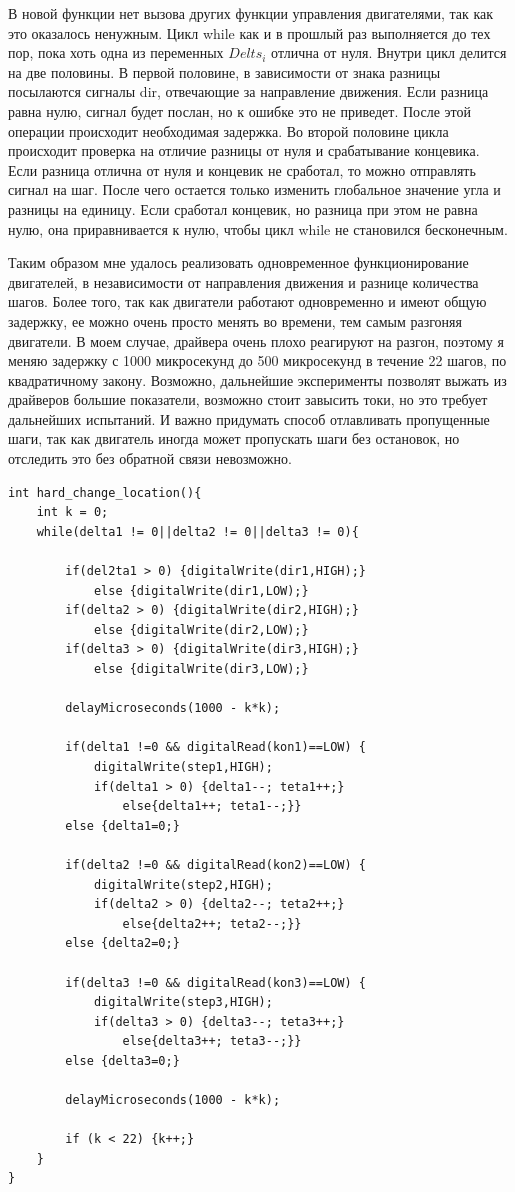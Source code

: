 В новой функции нет вызова других функции управления двигателями, так как это оказалось ненужным. Цикл while как и в прошлый раз выполняется до тех пор, пока хоть одна из переменных $Delts_{i}$ отлична от нуля. Внутри цикл делится на две половины. В первой половине, в зависимости от знака разницы посылаются сигналы dir, отвечающие за направление движения. Если разница равна нулю, сигнал будет послан, но к ошибке это не приведет. После этой операции происходит необходимая задержка. Во второй половине цикла происходит проверка на отличие разницы от нуля и срабатывание концевика. Если разница отлична от нуля и концевик не сработал, то можно отправлять сигнал на шаг. После чего остается только изменить глобальное значение угла и разницы на единицу. Если сработал концевик, но разница при этом не равна нулю, она приравнивается к нулю, чтобы цикл while не становился бесконечным.  

Таким образом мне удалось реализовать одновременное функционирование двигателей, в независимости от направления движения и разнице количества шагов. Более того, так как двигатели работают одновременно и имеют общую задержку, ее можно очень просто менять во времени, тем самым разгоняя двигатели. В моем случае, драйвера очень плохо реагируют на разгон, поэтому я меняю задержку с 1000 микросекунд до 500 микросекунд в течение 22 шагов, по квадратичному закону. Возможно, дальнейшие эксперименты позволят выжать из драйверов большие показатели, возможно стоит завысить токи, но это требует дальнейших испытаний. И важно придумать способ отлавливать пропущенные шаги, так как двигатель иногда может пропускать шаги без остановок, но отследить это без обратной связи невозможно.

\begin{lstlisting}[style=uno,caption=Усложненная функция с плавным разгоном]
int hard_change_location(){
    int k = 0;
    while(delta1 != 0||delta2 != 0||delta3 != 0){

        if(del2ta1 > 0) {digitalWrite(dir1,HIGH);}
            else {digitalWrite(dir1,LOW);}
        if(delta2 > 0) {digitalWrite(dir2,HIGH);}
            else {digitalWrite(dir2,LOW);}
        if(delta3 > 0) {digitalWrite(dir3,HIGH);}
            else {digitalWrite(dir3,LOW);}

        delayMicroseconds(1000 - k*k);

        if(delta1 !=0 && digitalRead(kon1)==LOW) {
            digitalWrite(step1,HIGH);
            if(delta1 > 0) {delta1--; teta1++;}
                else{delta1++; teta1--;}}
        else {delta1=0;}

        if(delta2 !=0 && digitalRead(kon2)==LOW) {
            digitalWrite(step2,HIGH);
            if(delta2 > 0) {delta2--; teta2++;}
                else{delta2++; teta2--;}}
        else {delta2=0;}

        if(delta3 !=0 && digitalRead(kon3)==LOW) {
            digitalWrite(step3,HIGH);
            if(delta3 > 0) {delta3--; teta3++;}
                else{delta3++; teta3--;}}
        else {delta3=0;}

        delayMicroseconds(1000 - k*k);

        if (k < 22) {k++;}
    }
}
\end{lstlisting}

